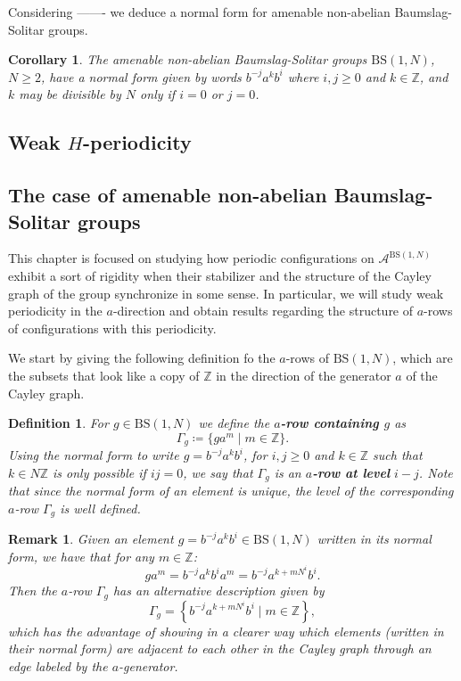 \documentclass[letterpaper,10pt]{article}
\theoremstyle{plain}
\newtheorem{definition}{Definition}[section]
\newtheorem{corollary}[theorem]{Corollary}
\newtheorem*{remark*}{Remark}
\newcommand{\BS}[1][N]{\mathrm{BS}(1,#1)}
\begin{document}
Considering ------- we deduce a normal form for amenable non-abelian Baumslag-Solitar groups.

\begin{corollary}\label{prop.normalform_bsgroups}
	The amenable non-abelian Baumslag-Solitar groups $\BS$, $N\ge 2$, have a normal form given by words $b^{-j}a^kb^{i}$ where $i,j\ge 0$ and $k\in \mathbb{Z}$, and $k$ may be divisible by $N$ only if $i=0$ or $j=0$.
\end{corollary}

	\subsection{Weak $H$-periodicity}\label{subsection.weak_H_periodicity}
	
	

	\subsection{The case of amenable non-abelian Baumslag-Solitar groups}\label{subsection.BS_periodicity}
	This chapter is focused on studying how periodic configurations on $\mathcal{A}^{\BS}$ exhibit a sort of rigidity when their stabilizer and the structure of the Cayley graph of the group synchronize in some sense. In particular, we will study weak periodicity in the $a$-direction and obtain results regarding the structure of $a$-rows of configurations with this periodicity.
	
	
	We start by giving the following definition fo the $a$-rows of $\BS$, which are the subsets that look like a copy of $\mathbb{Z}$ in the direction of the generator $a$ of the Cayley graph.
	\begin{definition}For $g\in \BS$ we define the \textbf{$a$-row containing $g$} as 
		$$
		\Gamma_g\coloneqq\{ ga^m\mid m\in \mathbb{Z}\}.
		$$
		Using the normal form to write $g=b^{-j}a^kb^i$, for $i,j\ge 0$ and $k\in \mathbb{Z}$ such that $k\in N\mathbb{Z}$ is only possible if $ij=0$, we say that $\Gamma_g$ is an \textbf{$a$-row at level } $i-j$. Note that since the normal form of an element is unique, the level of the corresponding $a$-row $\Gamma_g$ is well defined.
	\end{definition}
	\begin{remark*} Given an element $g=b^{-j}a^kb^i\in \BS$ written in its normal form, we have that for any $m\in \mathbb{Z}$:
		\begin{equation*}
		ga^m=b^{-j}a^kb^ia^m=b^{-j}a^{k+mN^i}b^i.
		\end{equation*}
		Then the $a$-row $\Gamma_g$ has an alternative description given by
		$$
		\Gamma_g=\left\{b^{-j}a^{k+mN^i}b^i\mid  m\in \mathbb{Z}  \right\},
		$$
		which has the advantage of showing in a clearer way which elements (written in their normal form) are adjacent to each other in the Cayley graph through an edge labeled by the $a$-generator.
	\end{remark*}
	
\end{document}
